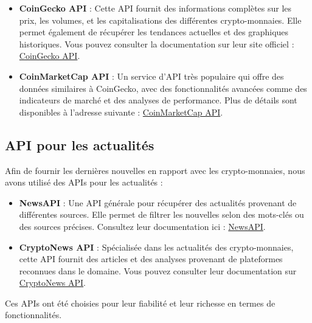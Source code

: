 \documentclass[a4paper,11pt]{article}
\begin{document}
\begin{itemize}
    \item \textbf{CoinGecko API} : Cette API fournit des informations complètes sur les prix, les volumes, et les capitalisations des différentes crypto-monnaies. Elle permet également de récupérer les tendances actuelles et des graphiques historiques. Vous pouvez consulter la documentation sur leur site officiel : \href{https://www.coingecko.com/en/api}{CoinGecko API}.

    \item \textbf{CoinMarketCap API} : Un service d'API très populaire qui offre des données similaires à CoinGecko, avec des fonctionnalités avancées comme des indicateurs de marché et des analyses de performance. Plus de détails sont disponibles à l'adresse suivante : \href{https://coinmarketcap.com/api/}{CoinMarketCap API}.
\end{itemize}

\subsection{API pour les actualités}
Afin de fournir les dernières nouvelles en rapport avec les crypto-monnaies, nous avons utilisé des APIs pour les actualités :

\begin{itemize}
    \item \textbf{NewsAPI} : Une API générale pour récupérer des actualités provenant de différentes sources. Elle permet de filtrer les nouvelles selon des mots-clés ou des sources précises. Consultez leur documentation ici : \href{https://newsapi.org/}{NewsAPI}.

    \item \textbf{CryptoNews API} : Spécialisée dans les actualités des crypto-monnaies, cette API fournit des articles et des analyses provenant de plateformes reconnues dans le domaine. Vous pouvez consulter leur documentation sur \href{https://cryptonews-api.com/}{CryptoNews API}.
\end{itemize}

Ces APIs ont été choisies pour leur fiabilité et leur richesse en termes de fonctionnalités.
\end{document}
